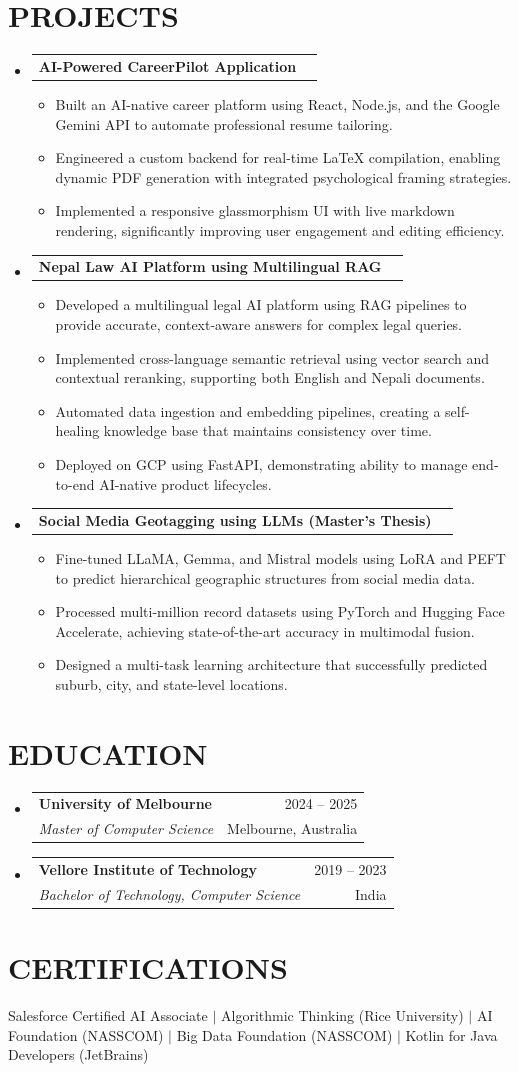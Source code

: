 \documentclass[letterpaper,11pt]{article}
\makeatletter
\newcommand{\resumeItem}[1]{\item\small{{#1 \vspace{-1pt}}}}
\newcommand{\resumeSubheading}[4]{
  \vspace{-1pt}\item
    \begin{tabular*}{\textwidth}[t]{l@{\extracolsep{\fill}}r}
      \textbf{#1} & {\color{dark-grey}\small #2}\vspace{1pt}\\
      \textit{#3} & {\color{dark-grey} \small #4}\\
    \end{tabular*}\vspace{-4pt}
}
\newcommand{\resumeProjectHeading}[2]{\item\begin{tabular*}{\textwidth}{l@{\extracolsep{\fill}}r}#1 & {\color{dark-grey}} \\ \end{tabular*}\vspace{-4pt}}
\newcommand{\resumeSubHeadingListStart}{\begin{itemize}[leftmargin=0in, label={}]}
\newcommand{\resumeSubHeadingListEnd}{\end{itemize}}
\newcommand{\resumeItemListStart}{\begin{itemize}}
\newcommand{\resumeItemListEnd}{\end{itemize}\vspace{0pt}}
\makeatother
\begin{document}
\section{PROJECTS}
\resumeSubHeadingListStart
\resumeProjectHeading{\textbf{AI-Powered CareerPilot Application}}{}
\resumeItemListStart
\resumeItem{Built an AI-native career platform using React, Node.js, and the Google Gemini API to automate professional resume tailoring.}
\resumeItem{Engineered a custom backend for real-time LaTeX compilation, enabling dynamic PDF generation with integrated psychological framing strategies.}
\resumeItem{Implemented a responsive glassmorphism UI with live markdown rendering, significantly improving user engagement and editing efficiency.}
\resumeItemListEnd

\resumeProjectHeading{\textbf{Nepal Law AI Platform using Multilingual RAG}}{}
\resumeItemListStart
\resumeItem{Developed a multilingual legal AI platform using RAG pipelines to provide accurate, context-aware answers for complex legal queries.}
\resumeItem{Implemented cross-language semantic retrieval using vector search and contextual reranking, supporting both English and Nepali documents.}
\resumeItem{Automated data ingestion and embedding pipelines, creating a self-healing knowledge base that maintains consistency over time.}
\resumeItem{Deployed on GCP using FastAPI, demonstrating ability to manage end-to-end AI-native product lifecycles.}
\resumeItemListEnd

\resumeProjectHeading{\textbf{Social Media Geotagging using LLMs (Master’s Thesis)}}{}
\resumeItemListStart
\resumeItem{Fine-tuned LLaMA, Gemma, and Mistral models using LoRA and PEFT to predict hierarchical geographic structures from social media data.}
\resumeItem{Processed multi-million record datasets using PyTorch and Hugging Face Accelerate, achieving state-of-the-art accuracy in multimodal fusion.}
\resumeItem{Designed a multi-task learning architecture that successfully predicted suburb, city, and state-level locations.}
\resumeItemListEnd
\resumeSubHeadingListEnd

\section{EDUCATION}
\resumeSubHeadingListStart
\resumeSubheading{University of Melbourne}{2024 -- 2025}{Master of Computer Science}{Melbourne, Australia}
\resumeSubheading{Vellore Institute of Technology}{2019 -- 2023}{Bachelor of Technology, Computer Science}{India}
\resumeSubHeadingListEnd

\section{CERTIFICATIONS}
\small{Salesforce Certified AI Associate $|$ Algorithmic Thinking (Rice University) $|$ AI Foundation (NASSCOM) $|$ Big Data Foundation (NASSCOM) $|$ Kotlin for Java Developers (JetBrains)}
\end{document}
